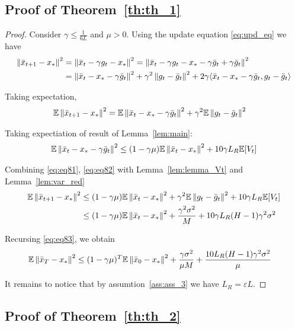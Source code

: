\subsection{Proof of Theorem~\ref{th:th_1}}
\begin{proof}
    Consider $\gamma \leq \frac{1}{6L}$ and $\mu > 0$.
    Using the update equation \eqref{eq:upd_eq} we have
    \begin{align}
        \left\|\bar{x}_{t+1}-x_*\right\|^2
        &= \left\|\bar{x}_{t} - \gamma g_t - x_*\right\|^2
        = \left\|\bar{x}_{t} - \gamma g_t - x_* - \gamma \bar{g}_t + \gamma \bar{g}_t\right\|^2 \\
        &= \left\|\bar{x}_t - x_* - \gamma \bar{g}_t\right\|^2 
        + \gamma^2 \left\|g_t - \bar{g}_t\right\|^2
        + 2 \gamma \langle \bar{x}_t - x_* - \gamma \bar{g}_t, g_t - \bar{g}_t\rangle
    \end{align}
    
    Taking expectation, 
    \begin{align}
        \mathbb{E} \left\|\bar{x}_{t+1}-x_*\right\|^2
        &= \mathbb{E} \left\|\bar{x}_t - x_* - \gamma \bar{g}_t\right\|^2
        + \gamma^2 \mathbb{E} \left\|g_t - \bar{g}_t\right\|^2 \label{eq:eq81}
    \end{align}
    
    
    Taking expectiation of result of Lemma~\ref{lem:main}:
    \begin{align}
        \mathbb{E} \left\|\bar{x}_t - x_* - \gamma \bar{g}_t\right\|^2 
        \leq (1 - \gamma \mu) \mathbb{E} \left\|\bar{x}_t - x_*\right\|^2 + 10 \gamma L_R \mathbb{E} [V_t] \label{eq:eq82}
    \end{align}

    Combining \eqref{eq:eq81}, \eqref{eq:eq82} with Lemma~\ref{lem:lemma_Vt} and Lemma~\ref{lem:var_red}
    \begin{align}
         \mathbb{E} \left\|\bar{x}_{t+1}-x_*\right\|^2
        &\leq (1 - \gamma \mu) \mathbb{E} \left\|\bar{x}_t - x_*\right\|^2 
        + \gamma^2 \mathbb{E} \left\|g_t - \bar{g}_t\right\|^2
        + 10 \gamma L_R \mathbb{E} [V_t] \\
        &\leq
        (1 - \gamma \mu) \mathbb{E} \left\|\bar{x}_t - x_*\right\|^2 
        + \frac{\gamma^2 \sigma^2}{M}
        + 10 \gamma L_R (H-1) \gamma^2 \sigma^2 \label{eq:eq83}
    \end{align}

    Recursing \eqref{eq:eq83}, we obtain
    \begin{align}
        \mathbb{E} \left\|\bar{x}_{T}-x_*\right\|^2 
        & \leq (1 - \gamma \mu)^T \mathbb{E} \left\|\bar{x}_0 - x_*\right\|^2 
        + \frac{\gamma \sigma^2} {\mu M} 
        + \frac{10 L_R (H-1) \gamma^2 \sigma^2}{\mu}
    \end{align}

    It remains to notice that by assumtion~\ref{ass:ass_3} we have $L_R = \varepsilon L$.
\end{proof}

\subsection{Proof of Theorem~\ref{th:th_2}}



